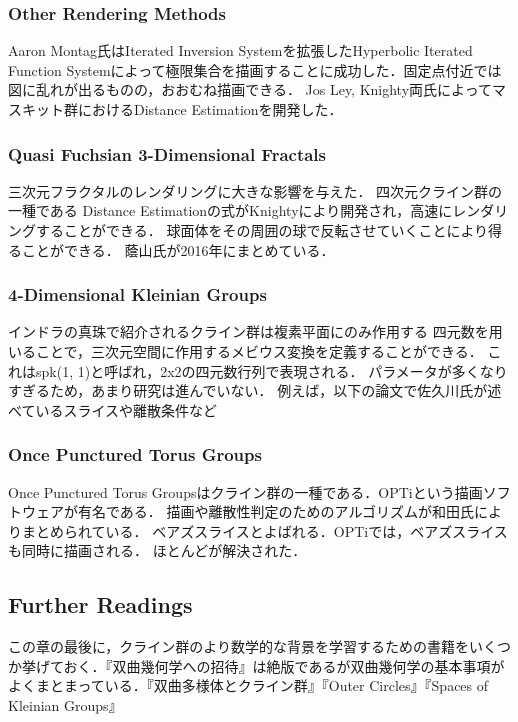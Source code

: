 \subsubsection{Other Rendering Methods}
Aaron Montag氏はIterated Inversion Systemを拡張したHyperbolic Iterated Function Systemによって極限集合を描画することに成功した\cite{hyperbolicIFS}．固定点付近では図に乱れが出るものの，おおむね描画できる．
Jos Ley, Knighty両氏によってマスキット群におけるDistance Estimationを開発した．

\subsubsection{Quasi Fuchsian 3-Dimensional Fractals}
三次元フラクタルのレンダリングに大きな影響を与えた．
四次元クライン群の一種である
Distance Estimationの式がKnightyにより開発され，高速にレンダリングすることができる．
球面体をその周囲の球で反転させていくことにより得ることができる．
蔭山氏が2016年にまとめている．

\subsubsection{4-Dimensional Kleinian Groups}
インドラの真珠で紹介されるクライン群は複素平面にのみ作用する
四元数を用いることで，三次元空間に作用するメビウス変換を定義することができる．
これはspk(1, 1)と呼ばれ，2x2の四元数行列で表現される．
パラメータが多くなりすぎるため，あまり研究は進んでいない．
例えば，以下の論文で佐久川氏が述べているスライスや離散条件など

\subsubsection{Once Punctured Torus Groups}
Once Punctured Torus Groupsはクライン群の一種である．OPTiという描画ソフトウェアが有名である．
描画や離散性判定のためのアルゴリズムが和田氏によりまとめられている．
ベアズスライスとよばれる．OPTiでは，ベアズスライスも同時に描画される．
ほとんどが解決された．

\subsection{Further Readings}
この章の最後に，クライン群のより数学的な背景を学習するための書籍をいくつか挙げておく．『双曲幾何学への招待』\cite{invitation}は絶版であるが双曲幾何学の基本事項がよくまとまっている．『双曲多様体とクライン群』\cite{manifold}『Outer Circles』\cite{outerCircles}『Spaces of Kleinian Groups』\cite{space}